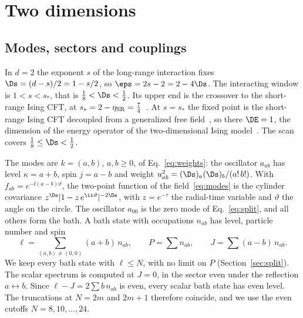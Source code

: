\section{Two dimensions}\label{d2:sec}

\subsection{Modes, sectors and couplings}\label{d2:modes}
In $d=2$ the exponent $s$ of the long-range interaction fixes $\Ds=(d-s)/2=1-s/2$, so $\eps=2s-2=2-4\Ds$. The
interacting window is $1<s<s_*$, that is $\frac18<\Ds<\frac12$. Its upper end is the crossover to the short-range Ising
CFT, at $s_*=2-\eta_{\rm SR}=\frac74$~\cite{Sak:1973oqx,Behan:2017dwr,Behan:2017emf}. At $s=s_*$ the fixed point is the
short-range Ising CFT decoupled from a generalized free field~\cite{Behan:2017dwr,Behan:2017emf}, so there $\DE=1$, the
dimension of the energy operator of the two-dimensional Ising model~\cite{Belavin:1984vu}. The scan covers
$\frac18\le\Ds<\frac12$.

The modes are $k=(a,b)$, $a,b\ge0$, of Eq.~\eqref{eq:weights}: the oscillator $a_{ab}$ has level $\kappa=a+b$, spin
$j=a-b$ and weight $u_{ab}^2=(\Ds)_a(\Ds)_b/(a!\,b!)$. With $f_{ab}=e^{-\ii(a-b)\vartheta}$, the two-point function of
the field~\eqref{eq:modes} is the cylinder covariance $z^{\Ds}|1-z\,e^{\ii\vartheta}|^{-2\Ds}$, with $z=e^{-\tau}$ the
radial-time variable and $\vartheta$ the angle on the circle. The oscillator $a_{00}$ is the zero mode of
Eq.~\eqref{eq:split}, and all others form the bath. A bath state with occupations $n_{ab}$ has level, particle number
and spin
\begin{equation}
 \ell=\sum_{(a,b)\neq(0,0)}(a+b)\,n_{ab},\qquad P=\sum n_{ab},\qquad J=\sum(a-b)\,n_{ab}.
\end{equation}
We keep every bath state with $\ell\le N$, with no limit on $P$ (Section~\ref{sec:split}). The scalar spectrum is
computed at $J=0$, in the sector even under the reflection $a\leftrightarrow b$. Since $\ell-J=2\sum b\,n_{ab}$ is
even, every scalar bath state has even level. The truncations at $N=2m$ and $2m+1$ therefore coincide, and we use the
even cutoffs $N=8,10,\dots,24$.

